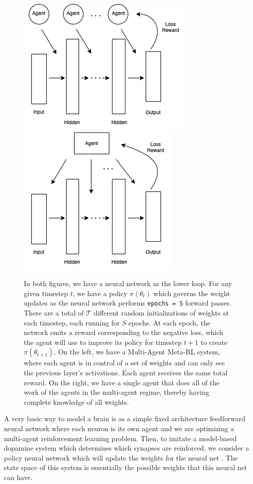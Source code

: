 \documentclass{article}
\begin{document}
\begin{figure}
  \centering
  \includegraphics[scale=0.6]{marlnn} \includegraphics[scale=0.6]{singleagent}
  \caption{In both figures, we have a neural network as the lower loop. For any given timestep $t$, we have a policy $\pi(\theta_t)$ which governs the weight updates as the neural network performs \texttt{epochs = S} forward passes. There are a total of $\mathcal{T}$ different random initializations of weights at each timestep, each running for $S$ epochs. At each epoch, the network emits a reward corresponding to the negative loss, which the agent will use to improve its policy for timestep $t+1$ to create $\pi(\theta_{t+1})$. On the left, we have a Multi-Agent Meta-RL system, where each agent is in control of a set of weights and can only see the previous layer's activations. Each agent receives the same total reward. On the right, we have a single agent that does all of the work of the agents in the multi-agent regime, thereby having complete knowledge of all weights.   \label{fig:meta-rl}}
\end{figure}
 
 
A very basic way to model a brain is as a simple fixed architecture feedforward neural network 
where each neuron is its own agent and we are optimizing a multi-agent reinforcement learning problem. 
Then, to imitate a model-based dopamine
system which determines which synapses are reinforced, we consider a policy
neural network which will update the weights for the neural net \cite{wang2018pfc, botvinick2019408}. The state space of
this system is essentially the possible weights that this neural net can have. 
\end{document}
